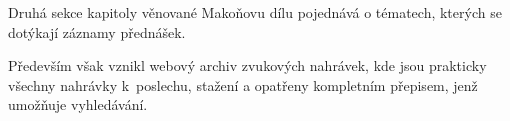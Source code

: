 Druhá sekce kapitoly věnované Makoňovu dílu pojednává o tématech, kterých se
dotýkají záznamy přednášek.

Především však vznikl webový archiv zvukových nahrávek, kde jsou
prakticky všechny nahrávky k~poslechu, stažení a opatřeny kompletním přepisem,
jenž umožňuje vyhledávání.

